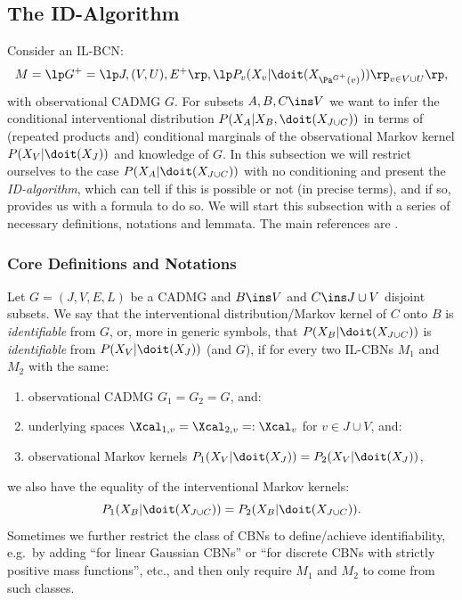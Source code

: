 
\subsection{The ID-Algorithm}


        Consider an IL-BCN:
            \[M= \lp G^+=\lp J,(V,U),E^+ \rp, \lp P_v ( X_v|\doit( X_{\Pa^{G^+}(v)})) \rp_{v \in V \cup U} \rp,\]
        with observational CADMG $G$.
        For subsets $A,B,C \ins V$ we want to infer the conditional interventional distribution $P(X_A|X_B,\doit(X_{J \cup C}))$ 
        in terms of (repeated products and) conditional marginals of the observational Markov kernel $P(X_V|\doit(X_J))$ 
        and knowledge of $G$. 
        In this subsection we will restrict ourselves to the case $P(X_A|\doit(X_{J \cup C}))$ with no conditioning and 
        present the \emph{ID-algorithm}, which can tell if this is possible or not (in precise terms), 
        and if so, provides us with a formula to do so. 
        We will start this subsection with a series of necessary definitions, notations and lemmata.
        The main references are \cite{Pearl09,GP95s,Tian2002,TP02s,Tian04s,SP06,HV06s,HV08s,RERS17,FM20}.

\subsubsection{Core Definitions and Notations}

\begin{Def} 
    \label{def:id-causal-effect}
    Let $G=(J,V,E,L)$ be a CADMG and $B \ins V$ and $C \ins J \cup V$ disjoint subsets.
    We say that the interventional distribution/Markov kernel of $C$ onto $B$ is \emph{identifiable} from $G$,
    or, more in generic symbols, that $P(X_B|\doit(X_{J \cup C}))$ is \emph{identifiable} from $P(X_V|\doit(X_J))$ (and $G$),
    if for every two IL-CBNs $M_1$ and $M_2$ with the same:
    \begin{enumerate}
        \item observational CADMG $G_1=G_2=G$, and: 
        \item underlying spaces $\Xcal_{1,v}=\Xcal_{2,v}=:\Xcal_v$ for $v \in J \cup V$, and:
        \item observational Markov kernels $P_1(X_V|\doit(X_J)) =P_2(X_V|\doit(X_J))$,
    \end{enumerate}
    we also have the equality of the interventional Markov kernels:
    \[ P_1(X_B|\doit(X_{J \cup C})) = P_2(X_B|\doit(X_{J \cup C})). \]
    Sometimes we further restrict the class of CBNs to define/achieve identifiability, e.g.\ by adding
    ``for linear Gaussian CBNs'' or ``for discrete CBNs with strictly positive mass functions'', etc., and then only require $M_1$ and $M_2$ 
    to come from such classes.
\end{Def}

